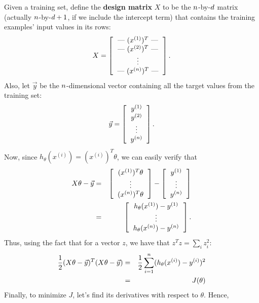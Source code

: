 \documentclass{article}
\begin{document}
Given a training set, define the {\bf design matrix} $X$ to be the
${n}$-by-${d}$ matrix (actually ${n}$-by-${d}+1$, if we include the intercept term)
that contains the training examples' input values in its rows:
\[
X = \left[ \begin{tabular}{c}
--- $(x^{(1)})^T$ --- \\
--- $(x^{(2)})^T$ --- \\
\vdots \\
--- $(x^{(\nexp)})^T$ ---
\end{tabular}
\right].
\]
Also, let $\vec{y}$ be the ${n}$-dimensional vector containing all the
target values from the training set:
\[
\vec{y} = \left[ \begin{tabular}{c}
$y^{(1)}$\\
$y^{(2)}$\\
\vdots \\
$y^{(\nexp)}$\\
\end{tabular}
\right].
\]
Now, since $h_\theta(x^{(i)}) = (x^{(i)})^T\theta$, we can easily verify that
\begin{eqnarray*}
X\theta - \vecy
&=& \left[ \begin{tabular}{c} $(x^{(1)})^T \theta$ \\ \vdots \\ $(x^{(\nexp)})^T \theta$ \end{tabular} \right]
- \left[ \begin{tabular}{c} $y^{(1)}$\\ \vdots \\ $y^{(\nexp)}$\\ \end{tabular} \right]  \\
&=& \left[ \begin{tabular}{c}
$h_\theta(x^{(1)}) - y^{(1)} $ \\
\vdots \\
$h_\theta(x^{(\nexp)}) - y^{(\nexp)} $
\end{tabular}
\right].
\end{eqnarray*}
Thus, using the fact that for a vector $z$, we have that $z^Tz = \sum_i z_i^2$:
\begin{eqnarray*}
\frac{1}{2} (X\theta - {\vec{y}})^T (X\theta - {\vec{y}}) &=&
\frac{1}{2} \sum_{i=1}^{n} (h_\theta({x^{(i)}}) - {y^{(i)}})^2 \\
&=& J(\theta)
\end{eqnarray*}
Finally, to minimize $J$, let's find its derivatives with respect
to $\theta$. Hence,
\end{document}
